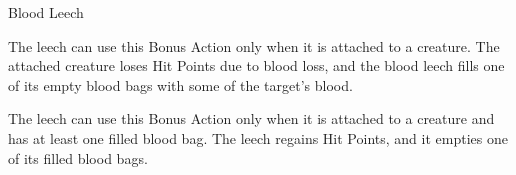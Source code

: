 \begin{DndMonster}[width=0.5\textwidth]{Blood Leech\label{monster:BloodLeech}}
	The leech can use this Bonus Action only when it is attached to a creature. The attached creature loses  Hit Points due to blood loss, and the blood leech fills one of its empty blood bags with some of the target's blood.
	
	The leech can use this Bonus Action only when it is attached to a creature and has at least one filled blood bag. The leech regains  Hit Points, and it empties one of its filled blood bags.
\end{DndMonster}